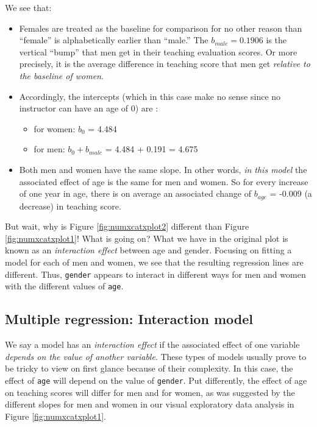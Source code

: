 \documentclass[12pt,]{krantz}
\providecommand{\tightlist}{%
  \setlength{\itemsep}{0pt}\setlength{\parskip}{0pt}}
\theoremstyle{definition}
\theoremstyle{definition}
\theoremstyle{definition}
\theoremstyle{remark}
\begin{document}
We see that:

\begin{itemize}
\tightlist
\item
  Females are treated as the baseline for comparison for no other reason
  than ``female'' is alphabetically earlier than ``male.'' The
  \(b_{male} = 0.1906\) is the vertical ``bump'' that men get in their
  teaching evaluation scores. Or more precisely, it is the average
  difference in teaching score that men get \emph{relative to the
  baseline of women}.
\item
  Accordingly, the intercepts (which in this case make no sense since no
  instructor can have an age of 0) are :

  \begin{itemize}
  \tightlist
  \item
    for women: \(b_0\) = 4.484
  \item
    for men: \(b_0 + b_{male}\) = 4.484 + 0.191 = 4.675
  \end{itemize}
\item
  Both men and women have the same slope. In other words, \emph{in this
  model} the associated effect of age is the same for men and women. So
  for every increase of one year in age, there is on average an
  associated change of \(b_{age}\) = -0.009 (a decrease) in teaching
  score.
\end{itemize}

But wait, why is Figure \ref{fig:numxcatxplot2} different than Figure
\ref{fig:numxcatxplot1}! What is going on? What we have in the original
plot is known as an \emph{interaction effect} between age and gender.
Focusing on fitting a model for each of men and women, we see that the
resulting regression lines are different. Thus, \texttt{gender} appears
to interact in different ways for men and women with the different
values of \texttt{age}.

\subsection{Multiple regression: Interaction
model}\label{model4interactiontable}

We say a model has an \emph{interaction effect} if the associated effect
of one variable \emph{depends on the value of another variable}. These
types of models usually prove to be tricky to view on first glance
because of their complexity. In this case, the effect of \texttt{age}
will depend on the value of \texttt{gender}. Put differently, the effect
of age on teaching scores will differ for men and for women, as was
suggested by the different slopes for men and women in our visual
exploratory data analysis in Figure \ref{fig:numxcatxplot1}.
\end{document}

